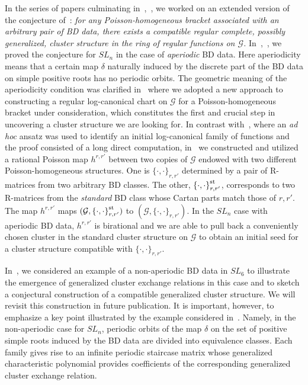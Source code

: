 \documentclass{amsart}
\theoremstyle{definition}
\theoremstyle{remark}
\numberwithin{equation}{section}
\numberwithin{theorem}{section}
\def\G{{\mathcal G}}
\def\Poi{{\{{\cdot},{\cdot}\}}}
\begin{document}
In the series of papers culminating in~\cite{GSVple},~\cite{GSVuni}, we worked on an extended version of the conjecture 
of~\cite{GSVM}: {\em for any Poisson-homogeneous bracket associated with an arbitrary pair of BD data, 
 there exists a  compatible regular complete, possibly generalized, cluster structure in the ring of regular functions on $\G$.} In~\cite{GSVple},~\cite{GSVuni}, we proved the conjecture for $SL_n$ in the case of {\em aperiodic\/} BD data. Here aperiodicity means that a certain map $\delta$ naturally induced by the discrete part of the BD data on simple positive roots has no periodic orbits.
The geometric meaning of the aperiodicity condition was clarified in~\cite{GSVuni} where we adopted a new approach to constructing a regular log-canonical chart on $\G$ for a Poisson-homogeneous bracket under consideration, which constitutes the first and crucial step in uncovering a cluster structure we are looking for. In contrast with~\cite{GSVple}, where an {\em ad hoc\/} ansatz  was used to identify an initial log-canonical family of functions and the proof consisted of a long direct computation, in~\cite{GSVuni} we constructed and utilized a rational Poisson map $h^{r,r'}$ between two copies of $\G$ endowed with two different Poisson-homogeneous structures. One is $\Poi_{r,r'}$ determined by a pair of R-matrices from two arbitrary BD classes. The other, $\Poi_{r,r'}^{\rm st}$, corresponds to two R-matrices from the {\em standard\/} BD class whose Cartan parts match those of $r, r'$. The  map $h^{r,r'}$ maps 
$(\G, \Poi_{r,r'}^{\rm st})$ to $(\G, \Poi_{r,r'})$. In the $SL_n$ case with aperiodic BD data, $h^{r,r'}$ is birational and we are able to pull back  a conveniently chosen  cluster in the standard cluster structure on $\G$ to obtain an initial seed for a cluster structure compatible with  $\Poi_{r,r'}$. 

In~\cite{GSVpest}, we considered an example of a non-aperiodic  BD data in $SL_6$ to illustrate the emergence of generalized cluster exchange relations in this case and to sketch a conjectural construction of a compatible generalized cluster structure. We will revisit this construction in future publication.
It is important, however, to emphasize a key point illustrated by the example considered in~\cite{GSVpest}. Namely, in the non-aperiodic case for $SL_n$, periodic orbits of the map $\delta$  on the set of positive simple roots induced by the BD data are  divided into equivalence classes. Each family gives rise to an infinite periodic staircase matrix whose generalized characteristic polynomial provides coefficients of the corresponding generalized cluster exchange relation.
\end{document}
